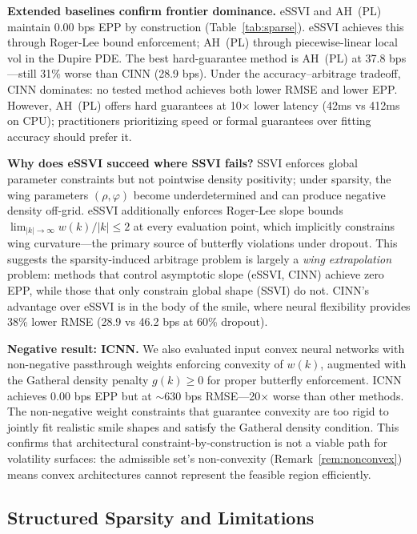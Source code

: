 \documentclass[11pt,a4paper]{article}
\begin{document}
\textbf{Extended baselines confirm frontier dominance.} eSSVI and AH~(PL) maintain 0.00 bps EPP by construction (Table~\ref{tab:sparse}). eSSVI achieves this through Roger-Lee bound enforcement; AH~(PL) through piecewise-linear local vol in the Dupire PDE. The best hard-guarantee method is AH~(PL) at 37.8 bps---still 31\% worse than CINN (28.9 bps). Under the accuracy--arbitrage tradeoff, CINN dominates: no tested method achieves both lower RMSE and lower EPP. However, AH~(PL) offers hard guarantees at 10$\times$ lower latency (42ms vs 412ms on CPU); practitioners prioritizing speed or formal guarantees over fitting accuracy should prefer it.

\textbf{Why does eSSVI succeed where SSVI fails?} SSVI enforces global parameter constraints but not pointwise density positivity; under sparsity, the wing parameters $(\rho, \varphi)$ become underdetermined and can produce negative density off-grid. eSSVI additionally enforces Roger-Lee slope bounds $\lim_{|k|\to\infty} w(k)/|k| \leq 2$ at every evaluation point, which implicitly constrains wing curvature---the primary source of butterfly violations under dropout. This suggests the sparsity-induced arbitrage problem is largely a \textit{wing extrapolation} problem: methods that control asymptotic slope (eSSVI, CINN) achieve zero EPP, while those that only constrain global shape (SSVI) do not. CINN's advantage over eSSVI is in the body of the smile, where neural flexibility provides 38\% lower RMSE (28.9 vs 46.2 bps at 60\% dropout).

\textbf{Negative result: ICNN.} We also evaluated input convex neural networks \citep{amos2017} with non-negative passthrough weights enforcing convexity of $w(k)$, augmented with the Gatheral density penalty $g(k) \geq 0$ for proper butterfly enforcement. ICNN achieves 0.00 bps EPP but at ${\sim}$630 bps RMSE---20$\times$ worse than other methods. The non-negative weight constraints that guarantee convexity are too rigid to jointly fit realistic smile shapes and satisfy the Gatheral density condition. This confirms that architectural constraint-by-construction is not a viable path for volatility surfaces: the admissible set's non-convexity (Remark~\ref{rem:nonconvex}) means convex architectures cannot represent the feasible region efficiently.

\subsection{Structured Sparsity and Limitations}
\end{document}
